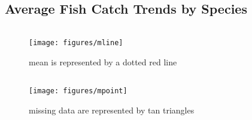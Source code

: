 \documentclass[
]{book}
\begin{document}
\hypertarget{average-fish-catch-trends-by-species}{%
\subsection{Average Fish Catch Trends by Species}\label{average-fish-catch-trends-by-species}}

\begin{columns-nocenter}

\begin{column}

\begin{figure}
\texttt{[image: figures/mline]} \caption{mean is represented by a dotted red line}\label{fig:unnamed-chunk-74}
\end{figure}

\end{column}

\begin{column}

\begin{figure}
\texttt{[image: figures/mpoint]} \caption{missing data are represented by tan triangles}\label{fig:unnamed-chunk-75}
\end{figure}

\end{column}

\begin{column}

\end{column}

\end{columns-nocenter}
\end{document}
